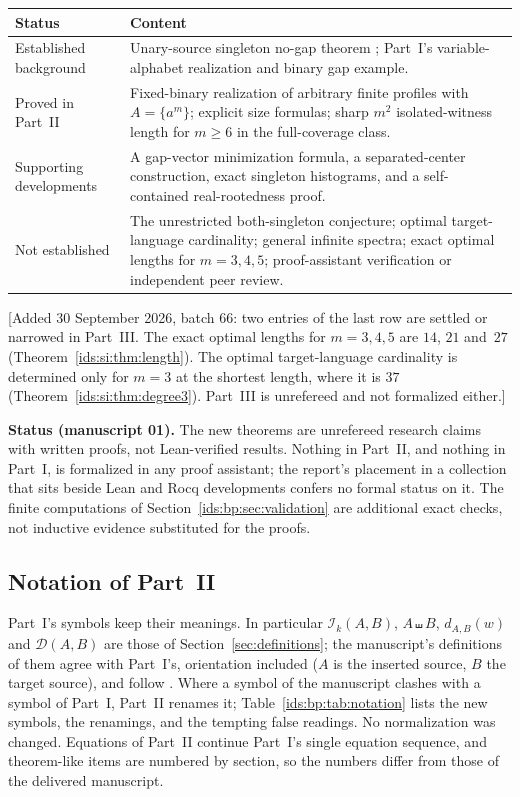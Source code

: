 \documentclass[11pt,letterpaper]{article}
\theoremstyle{definition}\newtheorem{definition}[theorem]{Definition}
\theoremstyle{remark}\newtheorem{remark}[theorem]{Remark}
\theoremstyle{definition}\newtheorem{question}[theorem]{Question}
\newcommand{\sh}{\mathbin{\shuffle}}
\newcommand{\ins}[3]{\mathcal I_{#1}(#2,#3)}
\newcommand{\spec}[2]{\mathcal D(#1,#2)}
\begin{document}
\begin{center}
\small
\begin{tabular}{@{}p{}p{}@{}}
\toprule
\textbf{Status} & \textbf{Content}\\
\midrule
Established background & Unary-source singleton no-gap theorem
\cite[Theorem~9]{Hughes2026}; Part~I's variable-alphabet realization and
binary gap example.\\[2mm]
Proved in Part~II & Fixed-binary realization of arbitrary finite profiles with
$A=\{a^m\}$; explicit size formulas; sharp $m^2$ isolated-witness length for
$m\geq6$ in the full-coverage class.\\[2mm]
Supporting developments & A gap-vector minimization formula, a
separated-center construction, exact singleton histograms, and a
self-contained real-rootedness proof.\\[2mm]
Not established & The unrestricted both-singleton conjecture; optimal
target-language cardinality; general infinite spectra; exact optimal lengths
for $m=3,4,5$; proof-assistant verification or independent peer review.\\
\bottomrule
\end{tabular}
\end{center}
[Added 30 September 2026, batch 66: two entries of the last row are settled
or narrowed in Part~III. The exact optimal lengths for $m=3,4,5$ are $14$,
$21$ and~$27$ (Theorem~\ref{ids:si:thm:length}). The optimal target-language
cardinality is determined only for $m=3$ at the shortest length, where it is
$37$ (Theorem~\ref{ids:si:thm:degree3}). Part~III is unrefereed and not
formalized either.]


\noindent\textbf{Status (manuscript 01).} The new theorems are unrefereed
research claims with written proofs, not Lean-verified results. Nothing in
Part~II, and nothing in Part~I, is formalized in any proof assistant; the
report's placement in a collection that sits beside Lean and Rocq
developments confers no formal status on it. The finite computations of
Section~\ref{ids:bp:sec:validation} are additional exact checks, not
inductive evidence substituted for the proofs.

\subsection{Notation of Part~II}\label{ids:bp:sec:notation}

Part~I's symbols keep their meanings. In particular $\ins{k}{A}{B}$,
$A\sh B$, $d_{A,B}(w)$ and $\spec{A}{B}$ are those of Section~\ref{sec:definitions};
the manuscript's definitions of them agree with Part~I's, orientation
included ($A$ is the inserted source, $B$ the target source), and follow
\cite[Sections~2 and~11]{Hughes2026}. Where a symbol of the manuscript clashes
with a symbol of Part~I, Part~II renames it; Table~\ref{ids:bp:tab:notation}
lists the new symbols, the renamings, and the tempting false readings. No
normalization was changed. Equations of Part~II continue Part~I's single
equation sequence, and theorem-like items are numbered by section, so the
numbers differ from those of the delivered manuscript.
\end{document}
